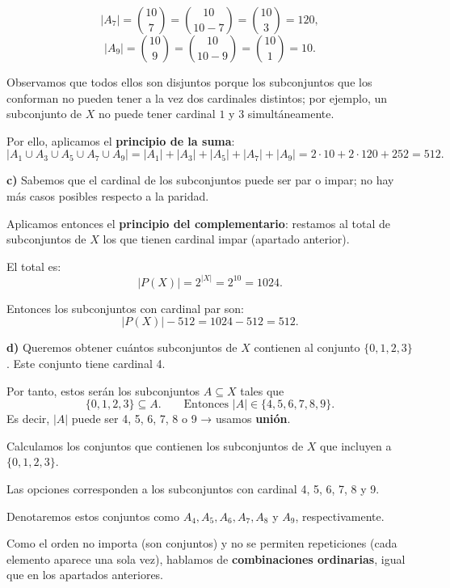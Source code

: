 \documentclass[a4paper,12pt]{article}
\begin{document}
\begin{ejercicio}[title=Ejercicio 15]
\[
|A_7| = \binom{10}{7}
= \binom{10}{10-7}
= \binom{10}{3}
= 120,
\]
\[
|A_9| = \binom{10}{9}
= \binom{10}{10-9}
= \binom{10}{1}
= 10.
\]

Observamos que todos ellos son disjuntos porque los subconjuntos que los conforman no pueden tener a la vez dos cardinales distintos; por ejemplo, un subconjunto de $X$ no puede tener cardinal $1$ y $3$ simultáneamente.

Por ello, aplicamos el \textbf{principio de la suma}:
\[
|A_1 \cup A_3 \cup A_5 \cup A_7 \cup A_9|
= |A_1| + |A_3| + |A_5| + |A_7| + |A_9|
= 2\cdot 10 + 2\cdot 120 + 252
= \boxed{512}.
\]

\vspace{1em}

\textbf{c)}  
Sabemos que el cardinal de los subconjuntos puede ser par o impar; no hay más casos posibles respecto a la paridad.

Aplicamos entonces el \textbf{principio del complementario}: restamos al total de subconjuntos de $X$ los que tienen cardinal impar (apartado anterior).

El total es:
\[
|P(X)| = 2^{|X|} = 2^{10} = 1024.
\]

Entonces los subconjuntos con cardinal par son:
\[
|P(X)| - 512
= 1024 - 512
= \boxed{512}.
\]

\textbf{d)} Queremos obtener cuántos subconjuntos de $X$ contienen al conjunto $\{0,1,2,3\}$.  
Este conjunto tiene cardinal 4.  

Por tanto, estos serán los subconjuntos $A \subseteq X$ tales que 
\[
\{0,1,2,3\} \subseteq A. \qquad \text{Entonces }|A| \in \{4,5,6,7,8,9\}. 
\]
Es decir, $|A|$ puede ser 4, 5, 6, 7, 8 o 9 → usamos \textbf{unión}.

\vspace{0.5em}

Calculamos los conjuntos que contienen los subconjuntos de $X$ que incluyen a $\{0,1,2,3\}$.

Las opciones corresponden a los subconjuntos con cardinal 4, 5, 6, 7, 8 y 9.  

Denotaremos estos conjuntos como $A_4, A_5, A_6, A_7, A_8$ y $A_9$, respectivamente.  

\vspace{0.5em}

Como el orden no importa (son conjuntos) y no se permiten repeticiones (cada elemento aparece una sola vez), hablamos de \textbf{combinaciones ordinarias}, igual que en los apartados anteriores.


\end{ejercicio}
\end{document}
